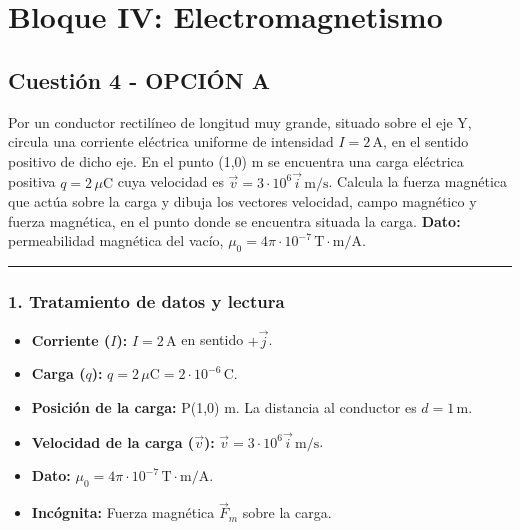 \newpage

\section{Bloque IV: Electromagnetismo}
\label{sec:em_2015_jul_ext}

\subsection{Cuestión 4 - OPCIÓN A}
\label{subsec:4A_2015_jul_ext}

\begin{cajaenunciado}
Por un conductor rectilíneo de longitud muy grande, situado sobre el eje Y, circula una corriente eléctrica uniforme de intensidad $I=2\,\text{A}$, en el sentido positivo de dicho eje. En el punto (1,0) m se encuentra una carga eléctrica positiva $q=2\,\mu\text{C}$ cuya velocidad es $\vec{v}=3\cdot10^{6}\vec{i}\,\text{m/s}$. Calcula la fuerza magnética que actúa sobre la carga y dibuja los vectores velocidad, campo magnético y fuerza magnética, en el punto donde se encuentra situada la carga.
\textbf{Dato:} permeabilidad magnética del vacío, $\mu_{0}=4\pi\cdot10^{-7}\,\text{T}\cdot\text{m/A}$.
\end{cajaenunciado}
\hrule

\subsubsection*{1. Tratamiento de datos y lectura}
\begin{itemize}
    \item \textbf{Corriente ($I$):} $I = 2 \, \text{A}$ en sentido $+\vec{j}$.
    \item \textbf{Carga ($q$):} $q = 2 \, \mu\text{C} = 2 \cdot 10^{-6} \, \text{C}$.
    \item \textbf{Posición de la carga:} P(1,0) m. La distancia al conductor es $d=1\,\text{m}$.
    \item \textbf{Velocidad de la carga ($\vec{v}$):} $\vec{v} = 3 \cdot 10^6 \vec{i} \, \text{m/s}$.
    \item \textbf{Dato:} $\mu_0 = 4\pi \cdot 10^{-7} \, \text{T}\cdot\text{m/A}$.
    \item \textbf{Incógnita:} Fuerza magnética $\vec{F}_m$ sobre la carga.
\end{itemize}

